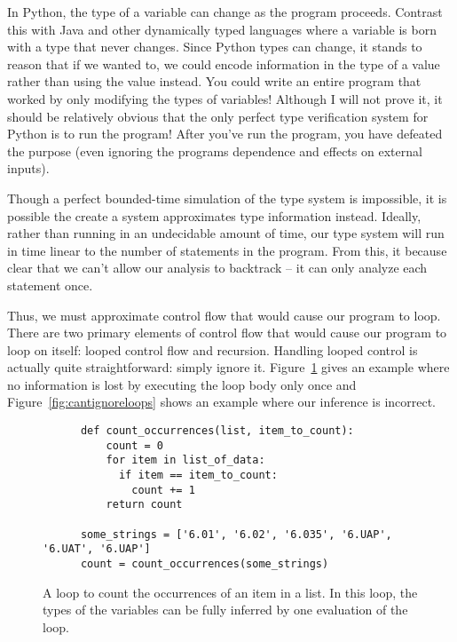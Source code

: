 \documentclass{article}[12pt]
\begin{document}
In Python, the type of a variable can change as the program proceeds. Contrast this with Java and other dynamically
typed languages where a variable is born with a type that never changes. Since Python types can change, it stands to
reason that if we wanted to, we could encode information in the type of a value rather than using the value instead. You
could write an entire program that worked by only modifying the types of variables! Although I will not prove it, it
should be relatively obvious that the only perfect type verification system for Python is to run the program! After
you've run the program, you have defeated the purpose (even ignoring the programs dependence and effects on external
inputs).

Though a perfect bounded-time simulation of the type system is impossible, it is possible the create a system approximates type
information instead. Ideally, rather than running in an undecidable amount of time, our type system will run in time
linear to the number of statements in the program. From this, it because clear that we can't allow our analysis to
backtrack -- it can only analyze each statement once. 

Thus, we must approximate control flow that would cause our program to loop. There are two primary
elements of control flow that would cause our program to loop on itself: looped control flow and
recursion. Handling looped control is actually quite straightforward: simply ignore it. Figure~\ref{fig:ignoreloops}
gives an example where no information is lost by executing the loop body only once and Figure~\ref{fig:cantignoreloops}
shows an example where our inference is incorrect.
\begin{figure}
    \begin{verbatim}
      def count_occurrences(list, item_to_count):
          count = 0
          for item in list_of_data:
            if item == item_to_count: 
              count += 1
          return count
      
      some_strings = ['6.01', '6.02', '6.035', '6.UAP', '6.UAT', '6.UAP']
      count = count_occurrences(some_strings)

  \end{verbatim}
  \caption{A loop to count the occurrences of an item in a list. In this loop, the types of the
      variables can be fully inferred by one evaluation of the loop.
  }
  \label{fig:ignoreloops}
\end{figure}
\end{document}

